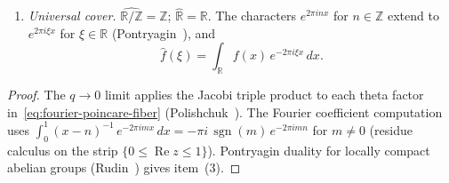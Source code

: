 \begin{proposition}
\begin{enumerate}
\item \emph{Universal cover.}
  $\widehat{\mathbb{R}/\mathbb{Z}} = \mathbb{Z}$;
  $\widehat{\mathbb{R}} = \mathbb{R}$.  The characters
  $e^{2\pi inx}$ for $n \in \mathbb{Z}$ extend to
  $e^{2\pi i\xi x}$ for $\xi \in \mathbb{R}$
  \textup{(}Pontryagin~\textup{\cite{Pont66})}, and
  \begin{equation}\label{eq:fourier-integral-from-FM}
  \hat{f}(\xi)
  = \int_{\mathbb{R}} f(x)\,e^{-2\pi i\xi x}\,dx.
  \end{equation}
\end{enumerate}
\end{proposition}

\begin{proof}
The $q \to 0$ limit applies the Jacobi triple product to each
theta factor in~\eqref{eq:fourier-poincare-fiber}
(Polishchuk~\cite[\S16.2]{Pol03}).  The Fourier coefficient
computation uses $\int_0^1 (x-n)^{-1}\,e^{-2\pi imx}\,dx
= -\pi i\,\operatorname{sgn}(m)\,e^{-2\pi imn}$ for
$m \neq 0$ (residue calculus on the strip
$\{0 \le \operatorname{Re} z \le 1\}$).
Pontryagin duality for locally compact abelian groups
(Rudin~\cite[\S1.7]{Rudin62})
gives item~(3).
\end{proof}

